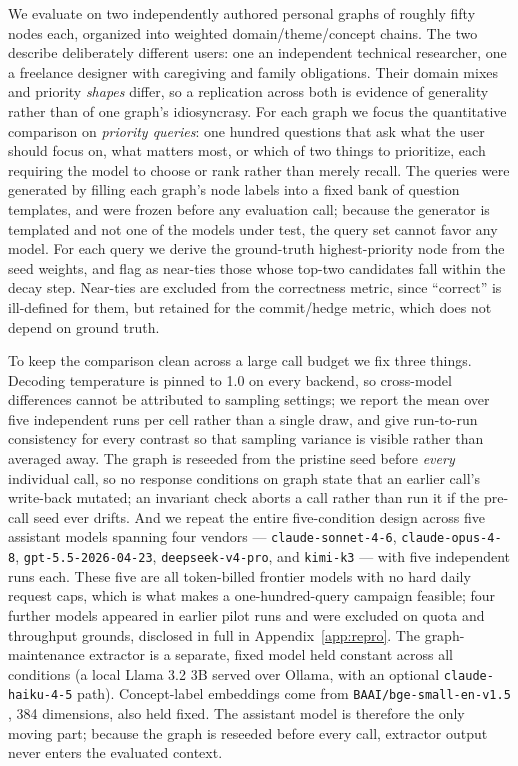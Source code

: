 \documentclass[11pt]{article}
\begin{document}
We evaluate on two independently authored personal graphs of roughly fifty nodes each, organized into weighted domain/theme/concept chains. The two describe deliberately different users: one an independent technical researcher, one a freelance designer with caregiving and family obligations. Their domain mixes and priority \emph{shapes} differ, so a replication across both is evidence of generality rather than of one graph's idiosyncrasy. For each graph we focus the quantitative comparison on \emph{priority queries}: one hundred questions that ask what the user should focus on, what matters most, or which of two things to prioritize, each requiring the model to choose or rank rather than merely recall. The queries were generated by filling each graph's node labels into a fixed bank of question templates, and were frozen before any evaluation call; because the generator is templated and not one of the models under test, the query set cannot favor any model. For each query we derive the ground-truth highest-priority node from the seed weights, and flag as near-ties those whose top-two candidates fall within the decay step. Near-ties are excluded from the correctness metric, since ``correct'' is ill-defined for them, but retained for the commit/hedge metric, which does not depend on ground truth.

To keep the comparison clean across a large call budget we fix three things. Decoding temperature is pinned to 1.0 on every backend, so cross-model differences cannot be attributed to sampling settings; we report the mean over five independent runs per cell rather than a single draw, and give run-to-run consistency for every contrast so that sampling variance is visible rather than averaged away. The graph is reseeded from the pristine seed before \emph{every} individual call, so no response conditions on graph state that an earlier call's write-back mutated; an invariant check aborts a call rather than run it if the pre-call seed ever drifts. And we repeat the entire five-condition design across five assistant models spanning four vendors --- \texttt{claude-sonnet-4-6}, \texttt{claude-opus-4-8}, \texttt{gpt-5.5-2026-04-23}, \texttt{deepseek-v4-pro}, and \texttt{kimi-k3} --- with five independent runs each. These five are all token-billed frontier models with no hard daily request caps, which is what makes a one-hundred-query campaign feasible; four further models appeared in earlier pilot runs and were excluded on quota and throughput grounds, disclosed in full in Appendix~\ref{app:repro}. The graph-maintenance extractor is a separate, fixed model held constant across all conditions (a local Llama 3.2 3B served over Ollama, with an optional \texttt{claude-haiku-4-5} path). Concept-label embeddings come from \texttt{BAAI/bge-small-en-v1.5} \citep{xiao2023cpack}, 384 dimensions, also held fixed. The assistant model is therefore the only moving part; because the graph is reseeded before every call, extractor output never enters the evaluated context.
\end{document}
